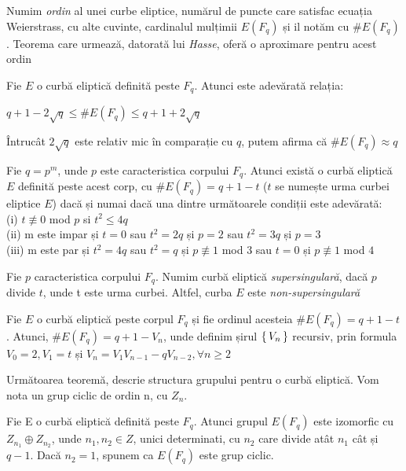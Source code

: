 \begin{dfn}
Numim \textit{ordin} al unei curbe eliptice, numărul de puncte care satisfac ecuația Weierstrass, cu alte cuvinte, cardinalul mulțimii $E(F_q)$ și il notăm cu $\# E(F_q)$. Teorema care urmează, datorată lui \textit{Hasse}, oferă o aproximare pentru acest ordin
\end{dfn}
\begin{teo}
Fie $E$ o curbă eliptică definită peste $F_q$. Atunci este adevărată relația:
\begin{center} $q + 1 - 2\sqrt{q}\leq \# E(F_q)\leq q+1 + 2\sqrt{q}$ \end{center}
Întrucât $2\sqrt{q}$ este relativ mic în comparație cu $q$, putem afirma că $\# E(F_q) \approx q$
\end{teo}
\begin{teo}
Fie $q = p^m$, unde $p$ este caracteristica corpului $F_q$. Atunci există o curbă eliptică $E$ definită peste acest corp, cu $\# E(F_q) = q+1-t$ ($t$ se numește urma curbei eliptice $E$) dacă și numai dacă una dintre următoarele condiții este adevărată: \\
(i) $t \not\equiv 0$ mod $p$ si $t^2\leq 4q$ \\
(ii) m este impar și $t=0$ sau $t^2 = 2q$ și $p=2$ sau $t^2 = 3q$ și $p=3$ \\ 
(iii) m este par și $t^2 = 4q$ sau $t^2 = q$ și $p\not\equiv 1$ mod $3$ sau $t= 0$ și $p\not\equiv 1$ mod $4$
\end{teo}
\begin{dfn}
Fie $p$ caracteristica corpului $F_q$. Numim curbă eliptică \textit{supersingulară}, dacă $p$ divide $t$, unde t este urma curbei. Altfel, curba $E$ este \textit{non-supersingulară}
\end{dfn}
\begin{teo}
Fie $E$ o curbă eliptică peste corpul $F_q$ și fie ordinul acesteia $\# E(F_q)= q+ 1-t$. Atunci, $\# E(F_q) = q+ 1 - V_n$, unde definim șirul $\set {V_n}$ recursiv, prin formula $V_0 = 2, V_1=t$ și $V_n = V_1V_{n-1} - qV_{n-2}, \forall n\geq 2$
\end{teo}
Următoarea teoremă, descrie structura grupului pentru o curbă eliptică. Vom nota un grup ciclic de ordin n, cu $Z_n$.
\begin{teo}
Fie E o curbă eliptică definită peste $F_q$. Atunci grupul $E(F_q)$ este izomorfic cu $Z_{n_1} \oplus Z_{n_2}$, unde $n_1, n_2\in Z$, unici determinati, cu $n_2$ care divide atât $n_1$ cât și $q-1$. Dacă $n_2=1$, spunem ca $E(F_q)$ este grup ciclic.
\end{teo}

